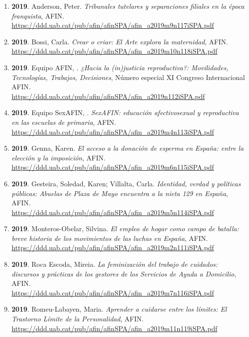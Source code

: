 \begin{enumerate}
\item {\bf 2019}. Anderson, Peter. {\it Tribunales tutelares y separaciones filiales en la época franquista}, AFIN. \\ \url{ https://ddd.uab.cat/pub/afin/afinSPA/afin\_a2019m9n117iSPA.pdf }\filbreak
\item {\bf 2019}. Bossi, Carla. {\it Crear o criar: El Arte explora la maternidad}, AFIN. \\ \url{ https://ddd.uab.cat/pub/afin/afinSPA/afin\_a2019m10n118iSPA.pdf }\filbreak
\item {\bf 2019}. Equipo AFIN, . {\it ¿Hacia la (in)justicia reproductiva?: Movilidades, Tecnologías, Trabajos, Decisiones}, Número especial XI Congreso Internacional AFIN. \\ \url{ https://ddd.uab.cat/pub/afin/afinSPA/afin\_a2019n112iSPA.pdf }\filbreak
\item {\bf 2019}. Equipo SexAFIN, . {\it SexAFIN: educación afectivosexual y reproductiva en las escuelas de primaria}, AFIN. \\ \url{ https://ddd.uab.cat/pub/afin/afinSPA/afin\_a2019m4n113iSPA.pdf }\filbreak
\item {\bf 2019}. Genna, Karen. {\it El acceso a la donación de esperma en España: entre la elección y la imposición}, AFIN. \\ \url{ https://ddd.uab.cat/pub/afin/afinSPA/afin\_a2019m6n115iSPA.pdf }\filbreak
\item {\bf 2019}. Gesteira, Soledad, Karen; Villalta, Carla. {\it Identidad, verdad y políticas públicas: Abuelas de Plaza de Mayo encuentra a la nieta 129 en España}, AFIN. \\ \url{ https://ddd.uab.cat/pub/afin/afinSPA/afin\_a2019m5n114iSPA.pdf }\filbreak
\item {\bf 2019}. Monteros-Obelar, Silvina. {\it El empleo de hogar como campo de batalla: breve historia de los movimientos de las luchas en España}, AFIN. \\ \url{ https://ddd.uab.cat/pub/afin/afinSPA/afin\_a2019m2n111iSPA.pdf }\filbreak
\item {\bf 2019}. Roca Escoda, Mireia. {\it La feminización del trabajo de cuidados: discursos y prácticas de los gestores de los Servicios de Ayuda a Domicilio}, AFIN. \\ \url{ https://ddd.uab.cat/pub/afin/afinSPA/afin\_a2019m7n116iSPA.pdf }\filbreak
\item {\bf 2019}. Romeu-Labayen, Maria. {\it Aprender a cuidarse entre los límites: El Trastorno Límite de la Personalidad}, AFIN. \\ \url{ https://ddd.uab.cat/pub/afin/afinSPA/afin\_a2019m11n119iSPA.pdf }\filbreak

\end{enumerate}
